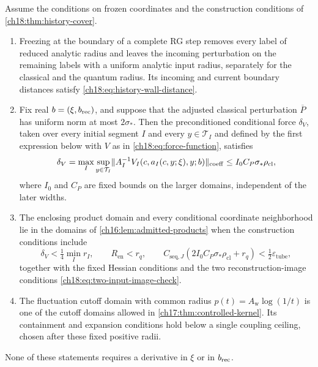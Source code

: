 \begin{lemma}\label{ch18:lem:history-input-contract}
Assume the conditions on frozen coordinates and the construction conditions of \cref{ch18:thm:history-cover}.
\begin{enumerate}
\item Freezing at the boundary of a complete RG step removes every label of reduced analytic radius and leaves the incoming perturbation on the remaining labels with a uniform analytic input radius, separately for the classical and the quantum radius. Its incoming and current boundary distances satisfy \eqref{ch18:eq:history-wall-distance}.
\item Fix real $b=(\xi,b_{\mathrm{rec}})$, and suppose that the adjusted classical perturbation $\overline P$ has uniform norm at most $2\sigma_*$. Then the preconditioned conditional force $\delta_V$, taken over every initial segment $I$ and every $y\in\mathcal T_I$ and defined by the first expression below with $V$ as in \eqref{ch18:eq:force-function}, satisfies
\begin{equation}\label{ch18:eq:conditional-force-check}
 \delta_V=\max_I\sup_{y\in\mathcal T_I}
  \lVert A_I^{-1}V_I(c,a_I(c,y;\xi),y;b)\rVert_{\mathrm{coeff}}
       \le I_0C_P\sigma_*\rho_{\mathrm{cl}},
\end{equation}
where $I_0$ and $C_P$ are fixed bounds on the larger domains, independent of the later widths.
\item The enclosing product domain and every conditional coordinate neighborhood lie in the domains of \cref{ch16:lem:admitted-products} when the construction conditions include
\begin{equation}\label{ch18:eq:prefix-sequential-check}
 \delta_V<\tfrac14\min_I r_I,\qquad
 R_{\mathrm{en}}<r_q,\qquad
 C_{\mathrm{seq},J}
       (2I_0C_P\sigma_*\rho_{\mathrm{cl}}+r_q)
                      <\tfrac12\varepsilon_{\mathrm{tube}},
\end{equation}
together with the fixed Hessian conditions and the two reconstruction-image conditions \eqref{ch18:eq:two-input-image-check}.
\item The fluctuation cutoff domain with common radius $p(t)=A_{\mathrm w}\log(1/t)$ is one of the cutoff domains allowed in \cref{ch17:thm:controlled-kernel}. Its containment and expansion conditions hold below a single coupling ceiling, chosen after these fixed positive radii.
\end{enumerate}
None of these statements requires a derivative in $\xi$ or in $b_{\mathrm{rec}}$.
\end{lemma}

